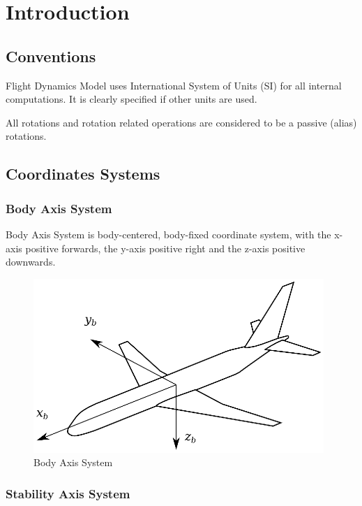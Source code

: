 \chapter{Introduction}


\section{Conventions}

Flight Dynamics Model uses International System of Units (SI) for all internal computations. It is clearly specified if other units are used.

All rotations and rotation related operations are considered to be a passive (alias) rotations.

\section{Coordinates Systems}

\subsection{Body Axis System}

Body Axis System is body-centered, body-fixed coordinate system, with the x\nobreakdash-axis positive forwards, the y\nobreakdash-axis positive right and the z\nobreakdash-axis positive downwards.

\begin{figure}
  \centering
  \includegraphics[width=110mm]{images/coordinate_system_BAS.eps}
  \caption{Body Axis System}
\end{figure}

\subsection{Stability Axis System}

